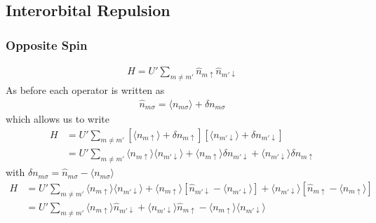 \documentclass[11pt]{article}
\begin{document}
\subsection{Interorbital Repulsion}
\subsubsection{Opposite Spin}
\begin{gather}
    H = U' \sum_{m \neq m'} \hat n_{m \uparrow}  \hat n_{m' \downarrow} 
\end{gather}
As before each operator is written as
\begin{gather}
    \hat n_{m\sigma} = \langle n_{m\sigma} \rangle + \delta n_{m \sigma}
\end{gather}
which allows us to write
\begin{align}
    H &= U' \sum_{m\neq m'} [\langle n_{m\uparrow} \rangle + \delta n_{m \uparrow}]
    [\langle n_{m'\downarrow} \rangle + \delta n_{m' \downarrow}] \\\nonumber
    &= U' \sum_{m \neq m'} \langle n_{m \uparrow}\rangle \langle n_{m' \downarrow}\rangle 
    + \langle n_{m\uparrow}\rangle \delta n_{m' \downarrow} + \langle n_{m' \downarrow}\rangle \delta n_{m \uparrow}
\end{align}
with $\delta n_{m\sigma} = \hat n_{m\sigma} - \langle n_{m\sigma}\rangle$
\begin{align}
    H &= U' \sum_{m\neq m'} \langle n_{m \uparrow}\rangle \langle n_{m' \downarrow}\rangle
    + \langle n_{m \uparrow}\rangle [\hat n_{m' \downarrow} - \langle n_{m'\downarrow}\rangle]
    + \langle n_{m'\downarrow}\rangle [\hat n_{m\uparrow} - \langle n_{m\uparrow}\rangle] \\\nonumber
    &= U' \sum_{m \neq m'} \langle n_{m\uparrow}\rangle \hat n_{m'\downarrow}
    + \langle n_{m' \downarrow}\rangle \hat n_{m\uparrow} 
    -\langle n_{m \uparrow}\rangle \langle n_{m' \downarrow}\rangle
\end{align}
\end{document}
